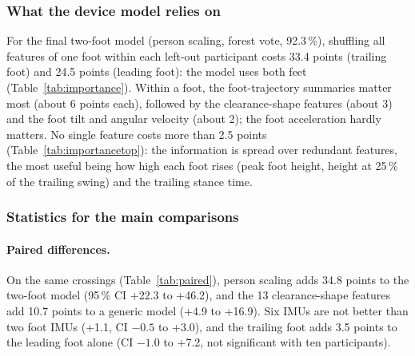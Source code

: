 \subsubsection{What the device model relies on}

For the final two-foot model (person scaling, forest vote, 92.3\,\%), shuffling all features of one foot within each left-out
participant costs 33.4 points (trailing foot) and 24.5 points (leading foot): the model uses both feet
(Table~\ref{tab:importance}). Within a foot, the foot-trajectory summaries matter most (about 6 points each), followed by the
clearance-shape features (about 3) and the foot tilt and angular velocity (about 2); the foot acceleration hardly matters. No single
feature costs more than 2.5 points (Table~\ref{tab:importancetop}): the information is spread over redundant features, the most
useful being how high each foot rises (peak foot height, height at 25\,\% of the trailing swing) and the trailing stance time.

\begin{table}[htbp]
\centering
\begin{minipage}{0.52\textwidth}
\centering
\caption{Permutation importance of feature groups (accuracy drop, mean $\pm$ SD over 10 shuffles).}
\label{tab:importance}

\end{minipage}\hfill
\begin{minipage}{0.44\textwidth}
\centering
\caption{The 12 most important single features.}
\label{tab:importancetop}

\end{minipage}
\end{table}

\subsubsection{Statistics for the main comparisons}

\paragraph{Paired differences.} On the same crossings (Table~\ref{tab:paired}), person scaling adds 34.8 points to the two-foot
model (95\,\% CI +22.3 to +46.2), and the 13 clearance-shape features add 10.7 points to a generic model (+4.9 to +16.9). Six IMUs
are not better than two foot IMUs (+1.1, CI $-0.5$ to +3.0), and the trailing foot adds 3.5 points to the leading foot alone (CI
$-1.0$ to +7.2, not significant with ten participants).

